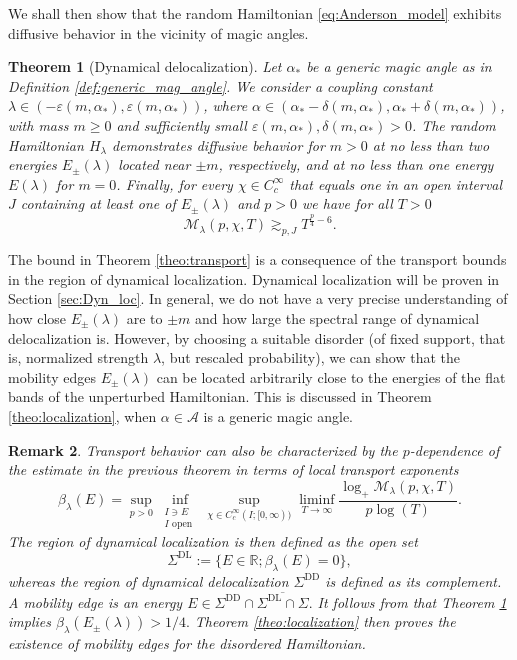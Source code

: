 \documentclass[reqno,12pt,letterpaper]{amsart}
\newcommand{\RR}{{\mathbb R}}
\newtheorem{theo}{Theorem}
\newtheorem{rem}[theo]{Remark}
\numberwithin{equation}{section}
\begin{document}
We shall then show that the random Hamiltonian \eqref{eq:Anderson_model} exhibits diffusive behavior in the vicinity of magic angles.
\begin{theo}[Dynamical delocalization]
\label{theo:transport}
Let $\alpha_*$ be a generic magic angle as in Definition \ref{def:generic_mag_angle}.
We consider a coupling constant $\lambda \in (-\varepsilon(m,\alpha_*),\varepsilon(m,\alpha_*))$, where $\alpha \in (\alpha_*- \delta(m,\alpha_*),\alpha_*+ \delta(m,\alpha_*))$, with mass $m \ge 0$ and sufficiently small $\varepsilon(m,\alpha_*),\delta(m,\alpha_*)>0$. The random Hamiltonian $H_{\lambda}$ demonstrates diffusive behavior for $m>0$ at no less than two energies $E_{\pm}(\lambda)$ located near $\pm m$, respectively, and at no less than one energy $E(\lambda)$ for $m=0$. 
Finally, for every $\chi \in C_c^{\infty}$ that equals one in an open interval $J$ containing at least one of $E_{\pm}(\lambda)$ and $p>0$ we have for all $T>0$
\[ \mathcal M_{\lambda}(p,\chi,T) \gtrsim_{p,J} T^{\frac{p}{4}-6}.\]
\end{theo}
{ The bound in Theorem \eqref{theo:transport} is a consequence of the transport
bounds in the region of dynamical localization. Dynamical localization will be proven in Section \ref{sec:Dyn_loc}.}
In general, we do not have a very precise understanding of how close $E_{\pm}(\lambda)$ are to $\pm m$ and how large the spectral range of dynamical delocalization is. However, by choosing a suitable disorder (of fixed support, that is, normalized strength $\lambda$, but rescaled probability), we can show that the mobility edges $E_{\pm}(\lambda)$ can be located arbitrarily close to the energies of the flat bands of the unperturbed Hamiltonian. This is discussed in Theorem \ref{theo:localization}, when $\alpha \in \mathcal A$ is a generic magic angle.
\begin{rem}
Transport behavior can also be characterized by the $p$-dependence of the estimate in the previous theorem in terms of local transport exponents
\[ \beta_{\lambda}(E) = \sup_{p>0} \inf_{\substack{I \ni E \\ I \text{ open }}} \sup_{\chi \in C_c^{\infty}(I;[0,\infty))} \liminf_{T \to \infty} \frac{\log_+ \mathcal M_{\lambda}(p,\chi,T)}{p \log(T)}.\]
The region of dynamical localization is then defined as the open set
\begin{equation}
\label{eq:DL}
\Sigma^{\operatorname{DL}} :=\{E \in \RR; \beta_{\lambda}(E)=0\},
\end{equation}
whereas the region of dynamical delocalization $\Sigma^{\operatorname{DD}}$ is defined as its complement.
A mobility edge is an energy $E \in \Sigma^{\operatorname{DD}} \cap \overline{\Sigma^{\operatorname{DL}}\cap \Sigma}.$ It follows from \cite[Theo.\ $2.10$, $2.11$]{GK04} that Theorem \ref{theo:transport} implies $\beta_{\lambda}(E_{\pm}(\lambda))>1/4.$ Theorem \ref{theo:localization} then proves the existence of mobility edges for the disordered Hamiltonian. 
\end{rem}
\end{document}
